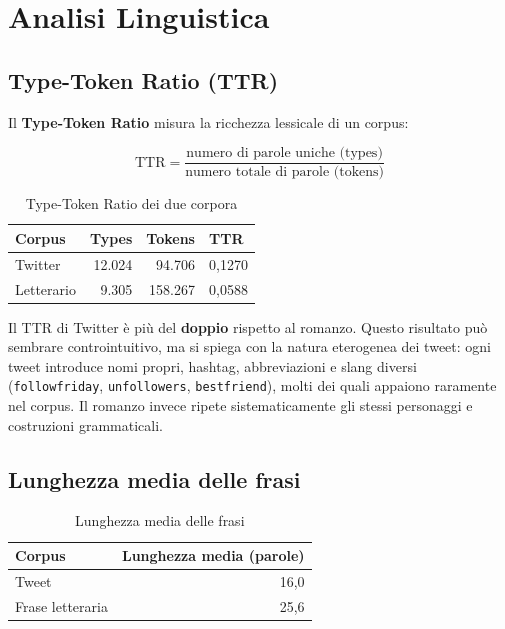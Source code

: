 \documentclass[12pt, a4paper]{article}
\begin{document}
\section{Analisi Linguistica}

\subsection{Type-Token Ratio (TTR)}

Il \textbf{Type-Token Ratio} misura la ricchezza lessicale di un corpus:

\begin{equation}
\text{TTR} = \frac{\text{numero di parole uniche (types)}}
                  {\text{numero totale di parole (tokens)}}
\end{equation}

\begin{table}[H]
\centering
\begin{tabular}{lrrl}
\toprule
\textbf{Corpus} & \textbf{Types} & \textbf{Tokens} & \textbf{TTR} \\
\midrule
Twitter    & 12.024 & 94.706  & 0,1270 \\
Letterario & 9.305  & 158.267 & 0,0588 \\
\bottomrule
\end{tabular}
\caption{Type-Token Ratio dei due corpora}
\end{table}

Il TTR di Twitter è più del \textbf{doppio} rispetto al romanzo.
Questo risultato può sembrare controintuitivo, ma si spiega con
la natura eterogenea dei tweet: ogni tweet introduce nomi propri,
hashtag, abbreviazioni e slang diversi (\texttt{followfriday},
\texttt{unfollowers}, \texttt{bestfriend}), molti dei quali appaiono
raramente nel corpus. Il romanzo invece ripete sistematicamente gli
stessi personaggi e costruzioni grammaticali.

\subsection{Lunghezza media delle frasi}

\begin{table}[H]
\centering
\begin{tabular}{lr}
\toprule
\textbf{Corpus} & \textbf{Lunghezza media (parole)} \\
\midrule
Tweet             & 16,0 \\
Frase letteraria  & 25,6 \\
\bottomrule
\end{tabular}
\caption{Lunghezza media delle frasi}
\end{table}
\end{document}
